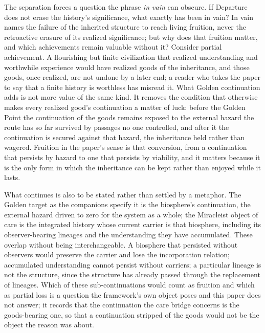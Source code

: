 The separation forces a question the phrase \emph{in vain} can obscure. If
Departure does not erase the history's significance, what exactly has been in
vain? In vain names the failure of the inherited structure to
reach living fruition, never the retroactive erasure of its realized
significance; but why does that fruition matter, and which achievements
remain valuable without it? Consider partial achievement. A flourishing but
finite civilization that realized understanding and worthwhile experience
would have realized goods of the inheritance, and those goods, once realized,
are not undone by a later end; a reader who takes the paper to say that a
finite history is worthless has misread it. What Golden continuation adds is
not more value of the same kind. It removes the condition that otherwise
makes every realized good's continuation a matter of luck: before the Golden
Point the continuation of the goods remains exposed to the external hazard the
route has so far survived by passages no one controlled, and after it the
continuation is secured against that hazard, the inheritance held rather than
wagered. Fruition in the paper's sense is that conversion, from a continuation
that persists by hazard to one that persists by viability, and it matters
because it is the only form in which the inheritance can be kept rather than
enjoyed while it lasts.

What continues is also to be stated rather than settled by a metaphor. The
Golden target as the companions specify it is the biosphere's continuation,
the external hazard driven to zero for the system as a whole; the Miracleist
object of care is the integrated history whose current carrier is that
biosphere, including its observer-bearing lineages and the understanding they
have accumulated. These overlap without being interchangeable. A biosphere that persisted without
observers would preserve the carrier and lose the incorporation relation;
accumulated understanding cannot persist without carriers; a particular
lineage is not the structure, since the structure has already passed through
the replacement of lineages. Which of these sub-continuations would count as
fruition and which as partial loss is a question the framework's own object
poses and this paper does not answer; it records that the continuation the
care bridge concerns is the goods-bearing one, so that a continuation stripped
of the goods would not be the object the reason was about.

